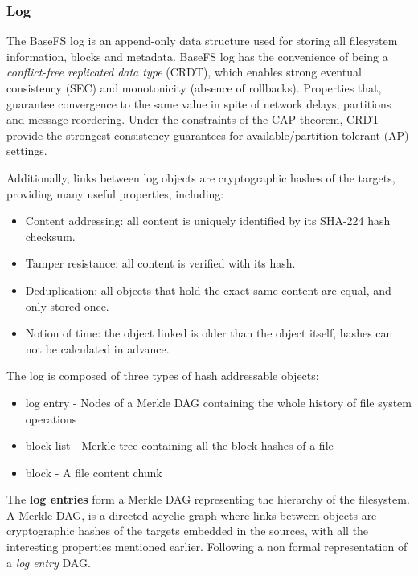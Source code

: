 \documentclass{sig-alternate}
\begin{document}
\subsubsection{Log}  \label{log}

The BaseFS log is an append-only data structure used for storing all filesystem information, blocks and metadata. BaseFS log has the convenience of being a \textit{conflict-free replicated data type} (CRDT), which enables strong eventual consistency (SEC) and monotonicity (absence of rollbacks). Properties that, guarantee convergence to the same value in spite of network delays, partitions and message reordering. Under the constraints of the CAP theorem, CRDT provide the strongest consistency guarantees for available/partition-tolerant (AP) settings.

Additionally, links between log objects are cryptographic hashes of the targets, providing many useful properties, including:

\begin{itemize}
\item Content addressing: all content is uniquely identified by its SHA-224 hash checksum.
\item Tamper resistance: all content is verified with its hash.
\item Deduplication: all objects that hold the exact same content are equal, and only stored once.
\item Notion of time: the object linked is older than the object itself, hashes can not be calculated in advance.
\end{itemize}

The log is composed of three types of hash addressable objects:

\begin{itemize}
    \item log entry - Nodes of a Merkle DAG containing the whole history of file system operations
    \item block list - Merkle tree containing all the block hashes of a file
    \item block - A file content chunk
\end{itemize}

The \textbf{log entries} form a Merkle DAG representing the hierarchy of the filesystem. A Merkle DAG, is a directed acyclic graph where links between objects are cryptographic hashes of the targets embedded in the sources, with all the interesting properties mentioned earlier. Following a non formal representation of a \textit{log entry} DAG.
\end{document}

